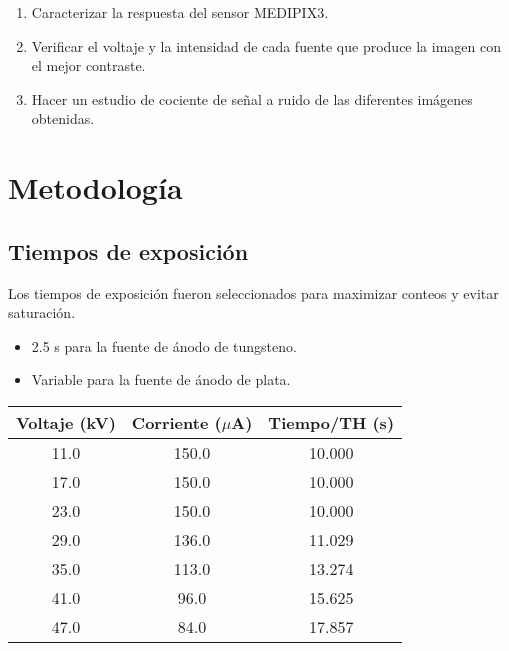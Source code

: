 \documentclass{sciposter}
\begin{document}
\begin{multicols}{3}
\begin{enumerate}
		\item Caracterizar la respuesta del sensor MEDIPIX3.
		
		\item Verificar el voltaje y la intensidad de cada fuente que produce la imagen con el mejor contraste.
		
		\item Hacer un estudio de cociente de señal a ruido de las diferentes imágenes obtenidas.
	\end{enumerate}

\section{Metodología}	
	\subsection{Tiempos de exposición}
	Los tiempos de exposición fueron seleccionados para maximizar conteos y evitar saturación.
	\begin{itemize}
		\item 2.5 s para la fuente de ánodo de tungsteno.
		\item Variable para la fuente de ánodo de plata. 
	\end{itemize}
	
	\begin{table}[h]
		\centering
		\small
		\begin{tabular}{| c | c c |}
			\hline
			\textbf{Voltaje (kV)} & \textbf{Corriente ($\mu$A)} & \textbf{Tiempo/TH (s)} \\
			\hline
			11.0 & 150.0 & 10.000 \\
			17.0 & 150.0 & 10.000 \\
			23.0 & 150.0 & 10.000 \\
			29.0 & 136.0 & 11.029 \\
			35.0 & 113.0 & 13.274 \\
			41.0 & 96.0 & 15.625 \\
			47.0 & 84.0 & 17.857 \\
			\hline
		\end{tabular}
		\label{tab:corrientes}
	\end{table}
	

\end{multicols}
\end{document}
